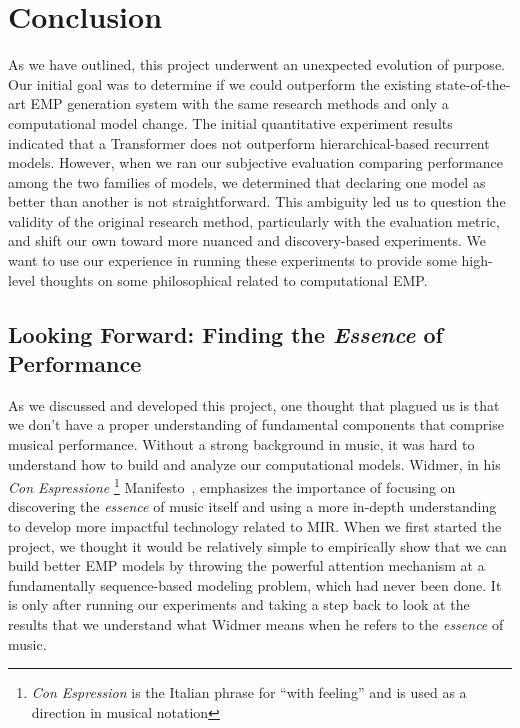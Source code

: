 \chapter{Conclusion} \label{ch:ch8}
As we have outlined, this project underwent an unexpected evolution of purpose. Our initial goal was to determine if we could outperform the existing state-of-the-art EMP generation system with the same research methods and only a computational model change. The initial quantitative experiment results indicated that a Transformer does not outperform hierarchical-based recurrent models. However, when we ran our subjective evaluation comparing performance among the two families of models, we determined that declaring one model as better than another is not straightforward. This ambiguity led us to question the validity of the original research method, particularly with the evaluation metric, and shift our own toward more nuanced and discovery-based experiments. We want to use our experience in running these experiments to provide some high-level thoughts on some philosophical related to computational EMP. 

\section{Looking Forward: Finding the \emph{Essence} of Performance}
As we discussed and developed this project, one thought that plagued us is that we don't have a proper understanding of fundamental components that comprise musical performance. Without a strong background in music, it was hard to understand how to build and analyze our computational models. Widmer, in his \emph{Con Espressione}%
\footnote{\emph{Con Espression} is the Italian phrase for ``with feeling'' and is used as a direction in musical notation} Manifesto~\cite{widmer2016getting}, emphasizes the importance of focusing on discovering the \emph{essence} of music itself and using a more in-depth understanding to develop more impactful technology related to MIR. When we first started the project, we thought it would be relatively simple to empirically show that we can build better EMP models by throwing the powerful attention mechanism at a fundamentally sequence-based modeling problem, which had never been done. It is only after running our experiments and taking a step back to look at the results that we understand what Widmer means when he refers to the \emph{essence} of music. 

